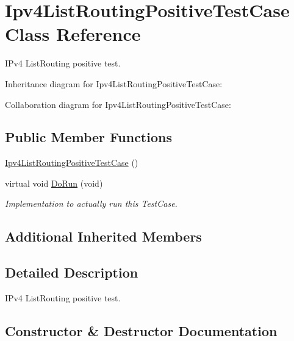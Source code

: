 \hypertarget{classIpv4ListRoutingPositiveTestCase}{}\section{Ipv4\+List\+Routing\+Positive\+Test\+Case Class Reference}
\label{classIpv4ListRoutingPositiveTestCase}


I\+Pv4 List\+Routing positive test.  




Inheritance diagram for Ipv4\+List\+Routing\+Positive\+Test\+Case\+:


Collaboration diagram for Ipv4\+List\+Routing\+Positive\+Test\+Case\+:
\subsection*{Public Member Functions}
\begin{DoxyCompactItemize}
\item 
\hyperlink{classIpv4ListRoutingPositiveTestCase_acc49cded420b503b7e2e009a0a23f853}{Ipv4\+List\+Routing\+Positive\+Test\+Case} ()
\item 
virtual void \hyperlink{classIpv4ListRoutingPositiveTestCase_ac62bd5eb4bad270b41995e576eb0168a}{Do\+Run} (void)
\begin{DoxyCompactList}\small\item\em Implementation to actually run this Test\+Case. \end{DoxyCompactList}\end{DoxyCompactItemize}
\subsection*{Additional Inherited Members}


\subsection{Detailed Description}
I\+Pv4 List\+Routing positive test. 

\subsection{Constructor \& Destructor Documentation}
